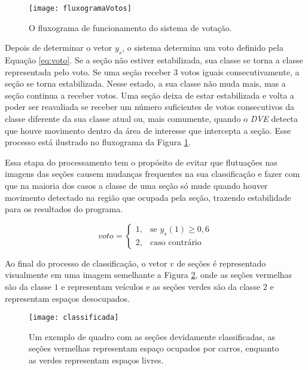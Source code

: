 \begin{figure}
	\centering
	\texttt{[image: fluxogramaVotos]}
	\caption{O fluxograma de funcionamento do sistema de votação.}
	\label{fig:fluxogramaVotos}
	\centering
\end{figure}


Depois de determinar o vetor $y_s$, o sistema determina um voto definido pela Equação \ref{eq:voto}.  Se a seção não estiver estabilizada, sua classe se torna a classe representada pelo voto. Se uma seção receber $3$ votos iguais consecutivamente, a seção se torna estabilizada. Nesse estado, a sua classe não muda mais, mas a seção continua a receber votos. Uma seção deixa de estar estabilizada e volta a poder ser reavaliada se receber um número suficientes de votos consecutivos da classe diferente da sua classe atual ou, mais comumente, quando o \textit{DVE} detecta que houve movimento dentro da área de interesse que intercepta a seção. Esse processo está ilustrado no fluxograma da Figura \ref{fig:fluxogramaVotos}.

Essa etapa do processamento tem o propósito de evitar que flutuações nas imagens das seções causem mudanças frequentes na sua classificação e fazer com que na maioria dos casos a classe de uma seção só mude quando houver movimento detectado na região que ocupada pela seção, trazendo estabilidade para os resultados do programa.

\begin{equation}
voto= 
\begin{cases}
    1,& \text{se } y_s(1) \geq 0,6\\
    2,& \text{caso contrário}
\end{cases}
\label{eq:voto}
\end{equation}


Ao final do processo de classificação, o vetor $v$ de seções é representado visualmente em uma imagem semelhante a Figura \ref{fig:exemploClassificacao}, onde as seções vermelhas são da classe $1$ e representam veículos e as seções verdes são da classe $2$ e representam espaços desocupados.

\begin{figure}
\centering
\texttt{[image: classificada]}
\centering
\caption{Um exemplo de quadro com as seções devidamente classificadas, as seções vermelhas representam espaço ocupados por carros, enquanto as verdes representam espaços livres.}
\label{fig:exemploClassificacao}
\end{figure}

